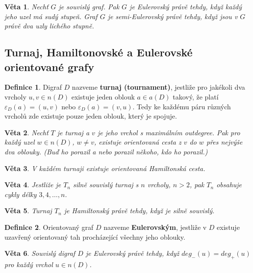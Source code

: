 \documentclass[a4]{report}
\newtheorem{theorem}{Věta}
\theoremstyle{definition}
\newtheorem{definition}{Definice}[section]
\begin{document}
\begin{theorem}
Nechť $G$ je souvislý graf. Pak $G$ je Eulerovský právě tehdy, když každý jeho uzel má sudý stupeň. Graf $G$ je semi-Eulerovský právě tehdy, když jsou v $G$ právě dva uzly lichého stupně.
\end{theorem}

\subsection{Turnaj, Hamiltonovské a Eulerovské orientované grafy}

\begin{definition}
Digraf $D$ nazveme \textbf{turnaj (tournament)}, jestliže pro jakékoli dva vrcholy $u, v \in n(D)$ existuje jeden oblouk $a \in a(D)$ takový, že platí $\varepsilon_D (a) = (u,v)$ nebo $\varepsilon_D (a) = (v,u)$. Tedy ke každému páru různých vrcholů zde existuje pouze jeden oblouk, který je spojuje.
\end{definition}

\begin{theorem}
Nechť $T$ je turnaj a $v$ je jeho vrchol s maximálním outdegree. Pak pro každý uzel $w \in n(D)$, $w \neq v$, existuje orientovaná cesta z $v$ do $w$ přes nejvýše dva oblouky. (Buď ho porazil a nebo porazil někoho, kdo ho porazil.)
\end{theorem}

\begin{theorem}
V každém turnaji existuje orientovaná Hamiltonská cesta.
\end{theorem}

\begin{theorem}
Jestliže je $T_n$ silně souvislý turnaj s $n$ vrcholy, $n >2$, pak $T_n$ obsahuje cykly délky $3,4, \ldots, n$.
\end{theorem}

\begin{theorem}
Turnaj $T_n$ je Hamiltonský právě tehdy, když je silně souvislý.
\end{theorem}

\begin{definition}
Orientovaný graf $D$ nazveme \textbf{Eulerovským}, jestliže v $D$ existuje uzavřený orientovaný tah procházející všechny jeho oblouky.
\end{definition}

\begin{theorem}
Souvislý digraf $D$ je Eulerovský právě tehdy, když $deg_- (u) = deg_+(u)$ pro každý vrchol $u \in n(D)$.
\end{theorem}
\end{document}
